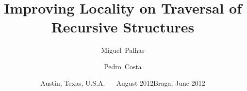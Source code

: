 
\title{Improving Locality on Traversal of Recursive Structures}

\author[M. Palhas \and P. Costa]{Miguel~Palhas \and Pedro~Costa}

\date{Austin, Texas, U.S.A. --- August 2012}

\subject{Summer Internship}




\date{Braga, June 2012}